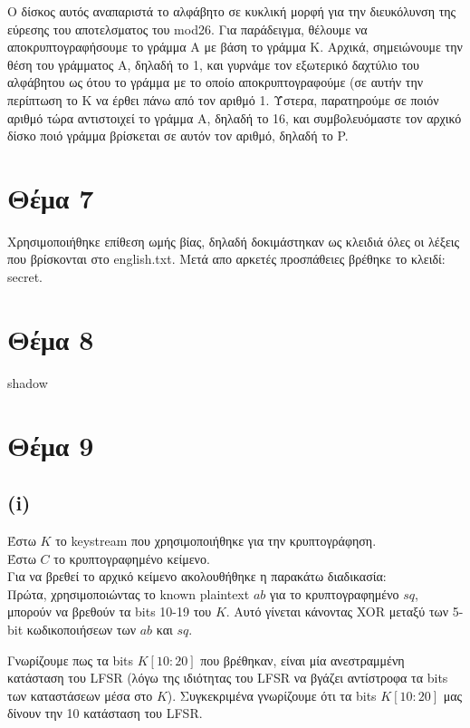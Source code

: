 \documentclass[a4paper, 11pt]{article}
\newcommand{\lt}{\latintext}
\begin{document}
Ο δίσκος αυτός αναπαριστά το αλφάβητο σε κυκλική μορφή για την διευκόλυνση της εύρεσης του αποτελσματος του {\lt mod26}.
Για παράδειγμα, θέλουμε να αποκρυπτογραφήσουμε το γράμμα Α με βάση το γράμμα Κ.
Αρχικά, σημειώνουμε την θέση του γράμματος Α, δηλαδή το 1, και γυρνάμε τον εξωτερικό δαχτύλιο του αλφάβητου ως ότου το γράμμα με το οποίο
αποκρυπτογραφούμε (σε αυτήν την περίπτωση το Κ να έρθει πάνω από τον αριθμό 1.
Ύστερα, παρατηρούμε σε ποιόν αριθμό τώρα αντιστοιχεί το γράμμα Α, δηλαδή το 16, και
συμβολευόμαστε τον αρχικό δίσκο ποιό γράμμα βρίσκεται σε αυτόν τον αριθμό, δηλαδή το {\lt P}.


\newpage


\section*{Θέμα 7}
Χρησιμοποιήθηκε επίθεση ωμής βίας, δηλαδή δοκιμάστηκαν ως κλειδιά όλες οι λέξεις που βρίσκονται στο {\lt english.txt}. Μετά απο αρκετές προσπάθειες
βρέθηκε το κλειδί: {\lt secret}.



\newpage


\section*{Θέμα 8}
shadow



\newpage


\section*{Θέμα 9}
\subsection*{{\lt (i)}}
Έστω $K$ το {\lt keystream} που χρησιμοποιήθηκε για την κρυπτογράφηση.\\
Έστω $C$ το κρυπτογραφημένο κείμενο.\\
Για να βρεθεί το αρχικό κείμενο ακολουθήθηκε η παρακάτω διαδικασία:\\

Πρώτα, χρησιμοποιώντας το {\lt known plaintext} $ab$ για το κρυπτογραφημένο $sq$, μπορούν να βρεθούν τα {\lt bits} 10-19 του $Κ$.
Αυτό γίνεται κάνοντας {\lt XOR} μεταξύ των 5-{\lt bit} κωδικοποιήσεων των $ab$ και $sq$.

Γνωρίζουμε πως τα {\lt bits} $Κ[10:20]$ που βρέθηκαν, είναι μία ανεστραμμένη κατάσταση του {\lt LFSR} (λόγω της ιδιότητας του {\lt LFSR} να βγάζει
αντίστροφα τα {\lt bits} των καταστάσεων μέσα στο $K$). Συγκεκριμένα γνωρίζουμε ότι τα {\lt bits} $Κ[10:20]$ μας δίνουν την 10 κατάσταση του {\lt LFSR}.\\
\end{document}
